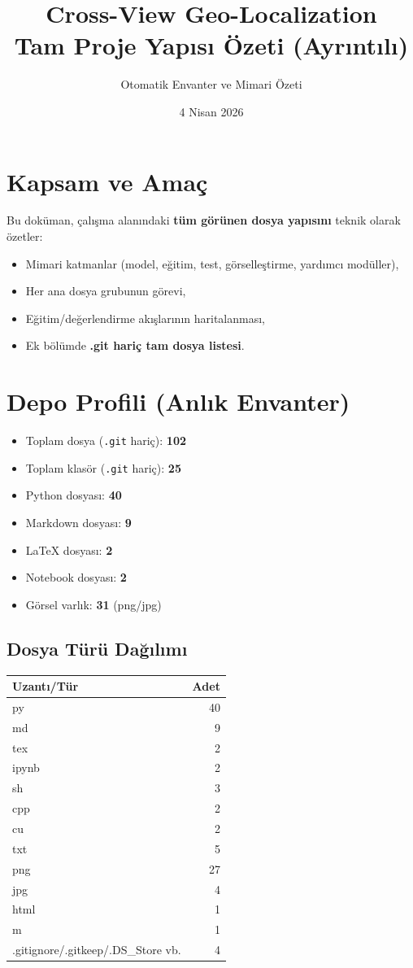 \documentclass[11pt,a4paper]{article}
\title{Cross-View Geo-Localization\\Tam Proje Yapısı Özeti (Ayrıntılı)}
\author{Otomatik Envanter ve Mimari Özeti}
\date{4 Nisan 2026}
\begin{document}
\maketitle

\section*{Kapsam ve Amaç}
Bu doküman, çalışma alanındaki \textbf{tüm görünen dosya yapısını} teknik olarak özetler:
\begin{itemize}
    \item Mimari katmanlar (model, eğitim, test, görselleştirme, yardımcı modüller),
    \item Her ana dosya grubunun görevi,
    \item Eğitim/değerlendirme akışlarının haritalanması,
    \item Ek bölümde \textbf{.git hariç tam dosya listesi}.
\end{itemize}

\section{Depo Profili (Anlık Envanter)}
\begin{itemize}
    \item Toplam dosya (\texttt{.git} hariç): \textbf{102}
    \item Toplam klasör (\texttt{.git} hariç): \textbf{25}
    \item Python dosyası: \textbf{40}
    \item Markdown dosyası: \textbf{9}
    \item LaTeX dosyası: \textbf{2}
    \item Notebook dosyası: \textbf{2}
    \item Görsel varlık: \textbf{31} (png/jpg)
\end{itemize}

\subsection*{Dosya Türü Dağılımı}
\begin{center}
\begin{tabular}{lr}
\toprule
Uzantı/Tür & Adet \\
\midrule
py & 40 \\
md & 9 \\
tex & 2 \\
ipynb & 2 \\
sh & 3 \\
cpp & 2 \\
cu & 2 \\
txt & 5 \\
png & 27 \\
jpg & 4 \\
html & 1 \\
m & 1 \\
.gitignore/.gitkeep/.DS\_Store vb. & 4 \\
\bottomrule
\end{tabular}
\end{center}
\end{document}
